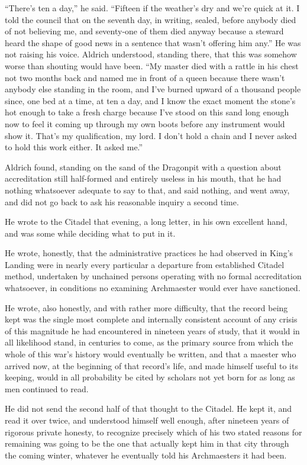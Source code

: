 “There’s ten a day,” he said. “Fifteen if the weather’s dry and we’re quick at it. I told the council that on the seventh day, in writing, sealed, before anybody died of not believing me, and seventy-one of them died anyway because a steward heard the shape of good news in a sentence that wasn’t offering him any.” He was not raising his voice. Aldrich understood, standing there, that this was somehow worse than shouting would have been. “My master died with a rattle in his chest not two months back and named me in front of a queen because there wasn’t anybody else standing in the room, and I’ve burned upward of a thousand people since, one bed at a time, at ten a day, and I know the exact moment the stone’s hot enough to take a fresh charge because I’ve stood on this sand long enough now to feel it coming up through my own boots before any instrument would show it. That’s my qualification, my lord. I don’t hold a chain and I never asked to hold this work either. It asked me.”

Aldrich found, standing on the sand of the Dragonpit with a question about accreditation still half-formed and entirely useless in his mouth, that he had nothing whatsoever adequate to say to that, and said nothing, and went away, and did not go back to ask his reasonable inquiry a second time.

\sceneBreak

He wrote to the Citadel that evening, a long letter, in his own excellent hand, and was some while deciding what to put in it.

He wrote, honestly, that the administrative practices he had observed in King’s Landing were in nearly every particular a departure from established Citadel method, undertaken by unchained persons operating with no formal accreditation whatsoever, in conditions no examining Archmaester would ever have sanctioned.

He wrote, also honestly, and with rather more difficulty, that the record being kept was the single most complete and internally consistent account of any crisis of this magnitude he had encountered in nineteen years of study, that it would in all likelihood stand, in centuries to come, as the primary source from which the whole of this war’s history would eventually be written, and that a maester who arrived now, at the beginning of that record’s life, and made himself useful to its keeping, would in all probability be cited by scholars not yet born for as long as men continued to read.

He did not send the second half of that thought to the Citadel. He kept it, and read it over twice, and understood himself well enough, after nineteen years of rigorous private honesty, to recognize precisely which of his two stated reasons for remaining was going to be the one that actually kept him in that city through the coming winter, whatever he eventually told his Archmaesters it had been.

